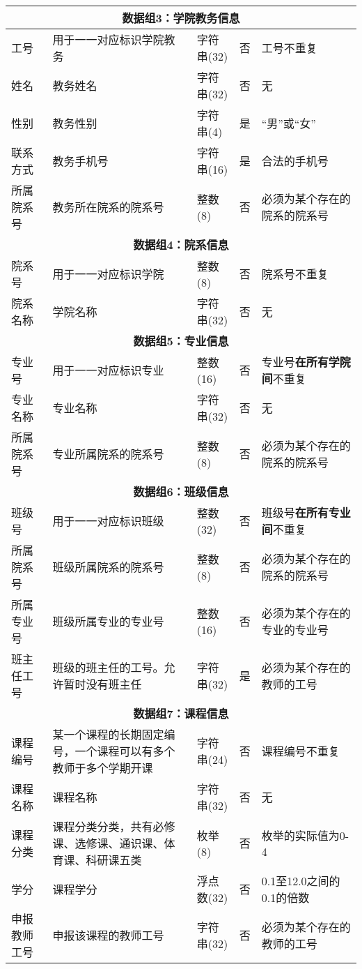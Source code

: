 \begin{center}
\begin{longtable}{p{6em}p{16em}p{8em}@{}p{2em}p{16em}}
        \multicolumn{5}{c}{\textbf{数据组3：学院教务信息}} \\
        \midrule
        工号 & 用于一一对应标识学院教务 & 字符串(32) & 否 & 工号不重复 \\   
        姓名 & 教务姓名 & 字符串(32) & 否 & 无 \\
        性别 & 教务性别 & 字符串(4) & 是 & “男”或“女” \\
        联系方式 & 教务手机号 & 字符串(16) & 是 & 合法的手机号 \\
        所属院系号 & 教务所在院系的院系号 & 整数(8) & 否 & 必须为某个存在的院系的院系号 \\
        \midrule

        \multicolumn{5}{c}{\textbf{数据组4：院系信息}} \\
        \midrule
        院系号 & 用于一一对应标识学院 & 整数(8) & 否 & 院系号不重复 \\
        院系名称 & 学院名称 & 字符串(32) & 否 & 无 \\
        \midrule

        \multicolumn{5}{c}{\textbf{数据组5：专业信息}} \\
        \midrule
        专业号 & 用于一一对应标识专业 & 整数(16) & 否 & 专业号\textbf{在所有学院间}不重复 \\
        专业名称 & 专业名称 & 字符串(32) & 否 & 无 \\
        所属院系号 & 专业所属院系的院系号 & 整数(8) & 否 & 必须为某个存在的院系的院系号 \\
        \midrule

        \multicolumn{5}{c}{\textbf{数据组6：班级信息}} \\
        \midrule
        班级号 & 用于一一对应标识班级 & 整数(32) & 否 & 班级号\textbf{在所有专业间}不重复 \\
        所属院系号 & 班级所属院系的院系号 & 整数(8) & 否 & 必须为某个存在的院系的院系号 \\
        所属专业号 & 班级所属专业的专业号 & 整数(16) & 否 & 必须为某个存在的专业的专业号 \\
        班主任工号 & 班级的班主任的工号。允许暂时没有班主任 & 字符串(32) & 是 & 必须为某个存在的教师的工号 \\
        \midrule

        \multicolumn{5}{c}{\textbf{数据组7：课程信息}} \\
        \midrule
        课程编号 & 某一个课程的长期固定编号，一个课程可以有多个教师于多个学期开课 & 字符串(24) & 否 & 课程编号不重复 \\
        课程名称 & 课程名称 & 字符串(32) & 否 & 无 \\
        课程分类 & 课程分类分类，共有必修课、选修课、通识课、体育课、科研课五类 & 枚举(8) & 否 & 枚举的实际值为0-4 \\
        学分 & 课程学分 & 浮点数(32) & 否 & 0.1至12.0之间的0.1的倍数 \\
        申报教师工号 & 申报该课程的教师工号 & 字符串(32) & 否 & 必须为某个存在的教师的工号 \\   
        \midrule


\end{longtable}
\end{center}
